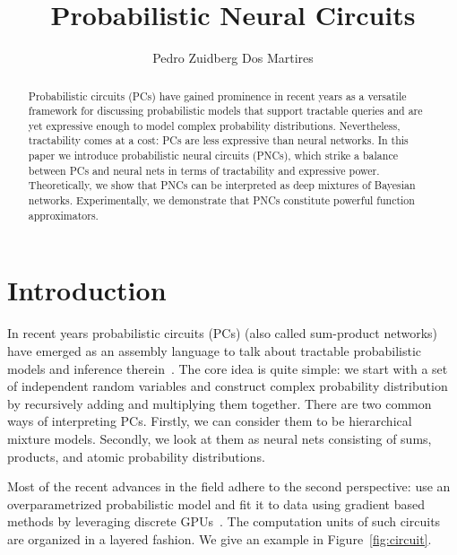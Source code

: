 \documentclass[letterpaper]{article} %
\title{Probabilistic Neural Circuits}
\author {
    Pedro Zuidberg Dos Martires
}
\begin{document}
\maketitle

\begin{abstract}
    Probabilistic circuits (PCs) have gained prominence in recent years as a versatile framework for discussing probabilistic models that support tractable queries and are yet expressive enough to model complex probability distributions.
    Nevertheless, tractability comes at a cost: PCs are less expressive than neural networks.
    In this paper we introduce probabilistic neural circuits (PNCs), which strike a balance between PCs and neural nets in terms of tractability and expressive power. Theoretically, we show that PNCs can be interpreted as deep mixtures of Bayesian networks. Experimentally, we demonstrate that PNCs constitute powerful function approximators.
\end{abstract}




\section{Introduction}

In recent years probabilistic circuits (PCs) (also called sum-product networks)~\citep{darwiche2003differential,poon2011sum} have emerged as an assembly language to talk about tractable probabilistic models and inference therein~\citep{vergari2021compositional}. The core idea is quite simple: we start with a set of independent random variables and construct complex probability distribution by recursively adding and multiplying them together.
There are two common ways of interpreting PCs. Firstly, we can consider them to be hierarchical mixture models. Secondly, we look at them as neural nets consisting of sums, products, and atomic probability distributions.

Most of the recent advances in the field adhere to the second perspective: use an overparametrized probabilistic model and fit it to data using gradient based methods by leveraging discrete GPUs~\citep{peharz2019random,dang2021juice}. The computation units of such circuits are organized in a layered fashion. We give an example in Figure~\ref{fig:circuit}.
\end{document}
